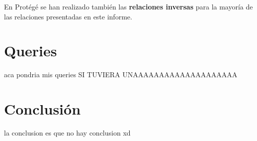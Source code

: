 \documentclass[11pt]{article}
\begin{document}
En Protégé se han realizado también las \textbf{relaciones inversas} para la
mayoría de las relaciones presentadas en este informe.

\section{Queries}

aca pondria mis queries SI TUVIERA UNAAAAAAAAAAAAAAAAAAAA

\section{Conclusión}

la conclusion es que no hay conclusion xd
\end{document}
